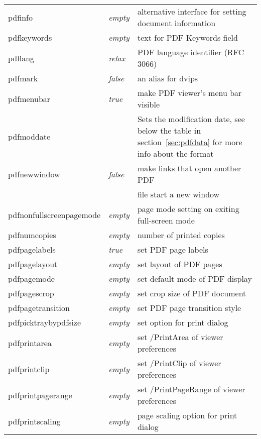\documentclass{article}
\begin{document}
\begin{longtable}{@{}>{\ttfamily}llp{7cm}@{}}
pdfinfo            & \textit{empty}         & alternative interface for setting document information\\
pdfkeywords        & \textit{empty}         & text for PDF Keywords field \\
pdflang            & \textit{relax}         & PDF language identifier (RFC 3066) \\
pdfmark            & \textit{false}         & an alias for \textsf{dvips} \\
pdfmenubar         & \textit{true}          & make PDF viewer's menu bar visible \\
pdfmoddate    &                        & Sets the modification date, see below the table in section~\ref{sec:pdfdata} for more info about the format\\                    
pdfnewwindow       & \textit{false}         & make links that open another PDF \\
                   &                        & file start a new window \\
pdfnonfullscreenpagemode
                   & \textit{empty}         & page mode setting on exiting
                                              full-screen mode\\
pdfnumcopies       & \textit{empty}         & number of printed copies\\
pdfpagelabels      & \textit{true}          & set PDF page labels \\
pdfpagelayout      & \textit{empty}         & set layout of PDF pages \\
pdfpagemode        & \textit{empty}         & set default mode of PDF display \\
pdfpagescrop       & \textit{empty}         & set crop size of PDF document \\
pdfpagetransition  & \textit{empty}         & set PDF page transition style \\
pdfpicktraybypdfsize
                   & \textit{empty}         & set option for print dialog \\
pdfprintarea       & \textit{empty}         & set /PrintArea of viewer preferences \\
pdfprintclip       & \textit{empty}         & set /PrintClip of viewer preferences \\
pdfprintpagerange  & \textit{empty}         & set /PrintPageRange of viewer preferences \\
pdfprintscaling    & \textit{empty}         & page scaling option for print dialog \\

\end{longtable}
\end{document}
